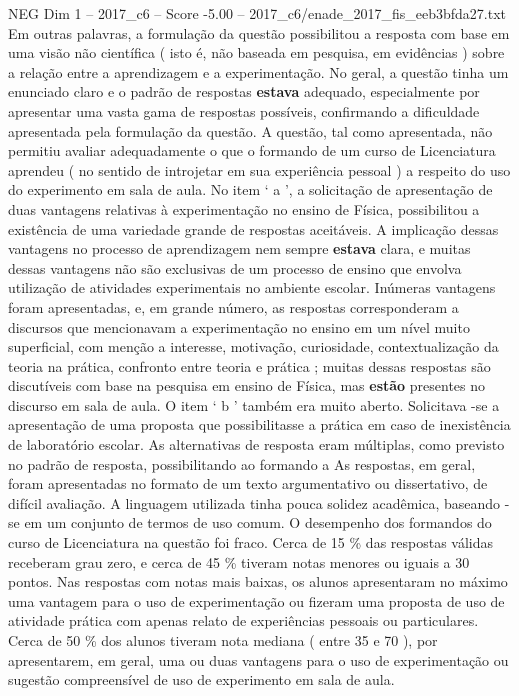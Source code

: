 \begin{textsample}{NEG Dim 1 – 2017\_c6 – Score -5.00 – 2017\_c6/enade\_2017\_fis\_eeb3bfda27.txt}
Em outras palavras, a formulação da questão possibilitou a resposta com base em uma visão não científica ( isto é, não baseada em pesquisa, em evidências ) sobre a relação entre a aprendizagem e a experimentação.
No geral, a questão tinha um enunciado claro e o padrão de respostas \textbf{estava} adequado, especialmente por apresentar uma vasta gama de respostas possíveis, confirmando a dificuldade apresentada pela formulação da questão.
A questão, tal como apresentada, não permitiu avaliar adequadamente o que o formando de um curso de Licenciatura aprendeu ( no sentido de introjetar em sua experiência pessoal ) a respeito do uso do experimento em sala de aula.
No item ‘ a ’, a solicitação de apresentação de duas vantagens relativas à experimentação no ensino de Física, possibilitou a existência de uma variedade grande de respostas aceitáveis.
A implicação dessas vantagens no processo de aprendizagem nem sempre \textbf{estava} clara, e muitas dessas vantagens não são exclusivas de um processo de ensino que envolva utilização de atividades experimentais no ambiente escolar.
Inúmeras vantagens foram apresentadas, e, em grande número, as respostas corresponderam a discursos que mencionavam a experimentação no ensino em um nível muito superficial, com menção a interesse, motivação, curiosidade, contextualização da teoria na prática, confronto entre teoria e prática ; muitas dessas respostas são discutíveis com base na pesquisa em ensino de Física, mas \textbf{estão} presentes no discurso em sala de aula.
O item ‘ b ’ também era muito aberto.
Solicitava -se a apresentação de uma proposta que possibilitasse a prática em caso de inexistência de laboratório escolar.
As alternativas de resposta eram múltiplas, como previsto no padrão de resposta, possibilitando ao formando a As respostas, em geral, foram apresentadas no formato de um texto argumentativo ou dissertativo, de difícil avaliação.
A linguagem utilizada tinha pouca solidez acadêmica, baseando -se em um conjunto de termos de uso comum.
O desempenho dos formandos do curso de Licenciatura na questão foi fraco.
Cerca de 15 \% das respostas válidas receberam grau zero, e cerca de 45 \% tiveram notas menores ou iguais a 30 pontos.
Nas respostas com notas mais baixas, os alunos apresentaram no máximo uma vantagem para o uso de experimentação ou fizeram uma proposta de uso de atividade prática com apenas relato de experiências pessoais ou particulares.
Cerca de 50 \% dos alunos tiveram nota mediana ( entre 35 e 70 ), por apresentarem, em geral, uma ou duas vantagens para o uso de experimentação ou sugestão compreensível de uso de experimento em sala de aula.

\end{textsample}
